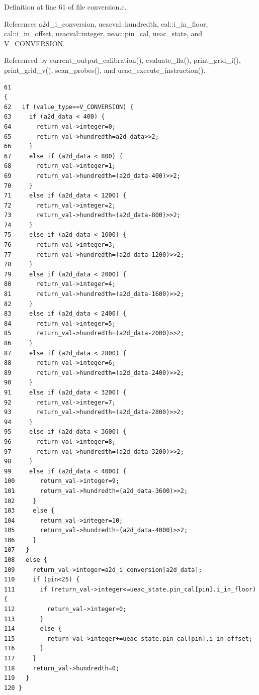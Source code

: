 Definition at line 61 of file conversion.c.

References a2d\_\-i\_\-conversion, ueacval::hundredth, cal::i\_\-in\_\-floor, cal::i\_\-in\_\-offset, ueacval::integer, ueac::pin\_\-cal, ueac\_\-state, and V\_\-CONVERSION.

Referenced by current\_\-output\_\-calibration(), evaluate\_\-lla(), print\_\-grid\_\-i(), print\_\-grid\_\-v(), scan\_\-probes(), and ueac\_\-execute\_\-instruction().

\footnotesize\begin{verbatim}61                                                                                         {
62   if (value_type==V_CONVERSION) {
63     if (a2d_data < 400) {
64       return_val->integer=0;
65       return_val->hundredth=a2d_data>>2;
66     }
67     else if (a2d_data < 800) {
68       return_val->integer=1;
69       return_val->hundredth=(a2d_data-400)>>2;
70     }
71     else if (a2d_data < 1200) {
72       return_val->integer=2;
73       return_val->hundredth=(a2d_data-800)>>2;
74     }
75     else if (a2d_data < 1600) {
76       return_val->integer=3;
77       return_val->hundredth=(a2d_data-1200)>>2;
78     }
79     else if (a2d_data < 2000) {
80       return_val->integer=4;
81       return_val->hundredth=(a2d_data-1600)>>2;
82     }
83     else if (a2d_data < 2400) {
84       return_val->integer=5;
85       return_val->hundredth=(a2d_data-2000)>>2;
86     }
87     else if (a2d_data < 2800) {
88       return_val->integer=6;
89       return_val->hundredth=(a2d_data-2400)>>2;
90     }
91     else if (a2d_data < 3200) {
92       return_val->integer=7;
93       return_val->hundredth=(a2d_data-2800)>>2;
94     }
95     else if (a2d_data < 3600) {
96       return_val->integer=8;
97       return_val->hundredth=(a2d_data-3200)>>2;
98     }
99     else if (a2d_data < 4000) {
100       return_val->integer=9;
101       return_val->hundredth=(a2d_data-3600)>>2;
102     }
103     else {
104       return_val->integer=10;
105       return_val->hundredth=(a2d_data-4000)>>2;
106     }
107   }
108   else {
109     return_val->integer=a2d_i_conversion[a2d_data];
110     if (pin<25) {
111       if (return_val->integer<=ueac_state.pin_cal[pin].i_in_floor) {
112         return_val->integer=0;
113       }
114       else {
115         return_val->integer+=ueac_state.pin_cal[pin].i_in_offset;
116       }
117     }
118     return_val->hundredth=0;
119   }
120 }
\end{verbatim}\normalsize 


